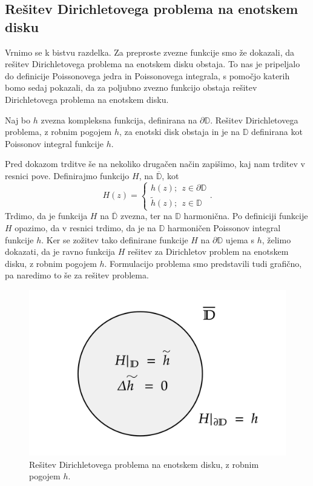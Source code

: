 \documentclass[mat1, tisk]{fmfdelo}
\begin{document}
\subsection{Rešitev Dirichletovega problema na enotskem disku}
    Vrnimo se k bistvu razdelka. Za preproste zvezne funkcije smo že dokazali, da rešitev Dirichletovega problema na enotskem disku obstaja. To nas je pripeljalo do definicije Poissonovega jedra in Poissonovega integrala, s pomočjo katerih bomo sedaj pokazali, da za poljubno zvezno funkcijo obstaja rešitev Dirichletovega problema na enotskem disku.
    \begin{trditev}
        \label{obstoj}
        Naj bo $h$ zvezna kompleksna funkcija, definirana na $\partial \mathbb{D}$. Rešitev Dirichletovega problema, z robnim pogojem $h$, za enotski disk obstaja in je na $\mathbb{D}$ definirana kot Poissonov integral funkcije $h$.
    \end{trditev}
    \begin{opomba}
        \label{opomba_obstoj}
        Pred dokazom trditve še na nekoliko drugačen način zapišimo, kaj nam trditev v resnici pove. 
        Definirajmo funkcijo $H$, na $\overline{\mathbb{D}}$, kot
        $$
            H(z) = \begin{cases}
                    h(z);~~z \in \partial \mathbb{D}\\
                    \widetilde{h}(z);~~z \in \mathbb{D}
            \end{cases}.
        $$
        Trdimo, da je funkcija $H$ na $\overline{\mathbb{D}}$ zvezna, ter na $\mathbb{D}$ harmonična. Po definiciji funkcije $H$ opazimo, da v resnici trdimo, da je na $\mathbb{D}$ harmoničen Poissonov integral funkcije $h$. 
        Ker se zožitev tako definirane funkcije $H$ na $\partial \mathbb{D}$ ujema s $h$, želimo dokazati, da je ravno funkcija $H$ rešitev za Dirichletov problem na enotskem disku, z robnim pogojem $h$. 
        Formulacijo problema smo predstavili tudi grafično, pa naredimo to še za rešitev problema. 
        \begin{figure}[H]
            \begin{center}
                \includegraphics[width = 0.6 \textwidth]{dirichlet_resitev.png}
                \caption{Rešitev Dirichletovega problema na enotskem disku, z robnim pogojem $h$.}
            \end{center}    
        \end{figure}
     \end{opomba}
\end{document}
